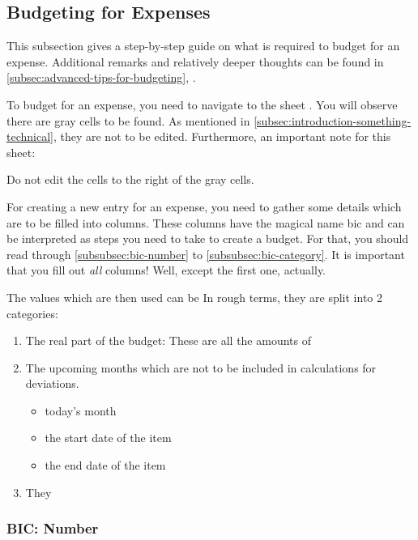 \subsection{Budgeting for Expenses}
\label{subsec:budgeting-expenses}

This subsection gives a step-by-step guide on what is required to budget for an expense.
Additional remarks and relatively deeper thoughts can be found in \autoref{subsec:advanced-tips-for-budgeting}, .

To budget for an expense, you need to navigate to the sheet .
You will observe there are gray cells to be found.
As mentioned in \autoref{subsec:introduction-something-technical}, they are not to be edited.
Furthermore, an important note for this sheet:
\begin{specialnote}
	Do not edit the cells to the right of the gray cells.
\end{specialnote}

For creating a new entry for an expense, you need to gather some details which are to be filled into columns.
These columns have the magical name \ac{bic} and can be interpreted as steps you need to take to create a budget.
For that, you should read through \autoref{subsubsec:bic-number} to \autoref{subsubsec:bic-category}.
It is important that you fill out \emph{all} columns!
Well, except the first one, actually.

The values which are then used can be In rough terms, they are split into 2 categories:
\begin{enumerate}
	\item The real part of the budget:
	These are all the amounts of 
	\item The upcoming months which are not to be included in calculations for deviations.
	\begin{itemize}
		\item today's month
		\item the start date of the item
		\item the end date of the item
	\end{itemize}	
	\item They
\end{enumerate}

\subsubsection{BIC: Number}
\label{subsubsec:bic-number}

